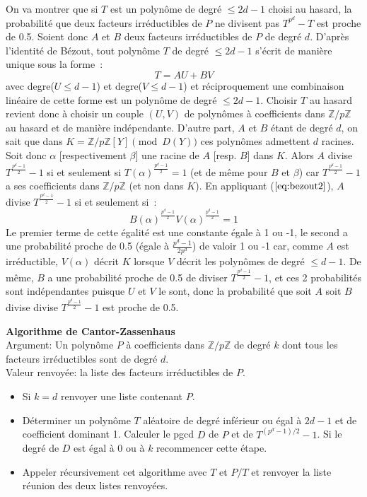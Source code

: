 \documentclass[a4paper,11pt]{book}
\begin{document}
\begin{giacjshere}
On va montrer que si $T$ est un polynôme de degré $\leq 2d-1$ choisi au hasard,
la probabilité que deux facteurs irréductibles de $P$ ne divisent pas 
$T^{p^d}-T$ est proche de 0.5. Soient donc $A$ et $B$ deux facteurs
irréductibles de $P$ de degré $d$. D'après l'identité de Bézout, tout 
polynôme $T$ de degré $\leq 2d-1$ s'écrit de manière unique sous la forme~:
\begin{equation} \label{eq:bezout2} 
T = A U + B V 
\end{equation}
avec degre($U \leq d-1$) et degre($V \leq d-1$) et réciproquement 
une combinaison linéaire de cette forme est un polynôme de degré $\leq 2d-1$.
Choisir $T$ au hasard revient donc à choisir un couple $(U,V)$ de polynômes
à coefficients dans $\mathbb{Z}/p\mathbb{Z}$ au hasard et
de manière indépendante. D'autre part, $A$ et $B$ étant de degré $d$, on
sait que dans $K=\mathbb{Z}/p\mathbb{Z}[Y] \pmod{D(Y)}$ ces polynômes admettent $d$ racines.
Soit donc $\alpha$ [respectivement $\beta$] une racine de $A$ [resp. $B$]
dans $K$. Alors $A$ divise $T^{\frac{p^d-1}{2}}-1$
si et seulement si $T(\alpha )^{\frac{p^d-1}{2}}=1$ (et de même pour
$B$ et $\beta$) car $T^{\frac{p^d-1}{2}}-1$ a ses coefficients dans
$\mathbb{Z}/p\mathbb{Z}$ (et non dans $K$). 
En appliquant (\(\ref{eq:bezout2}\)), $A$ divise $T^{\frac{p^d-1}{2}}-1$
si et seulement si~:
\[ B(\alpha )^{\frac{p^d-1}{2}}V(\alpha )^{\frac{p^d-1}{2}}=1 \]
Le premier terme de cette égalité est une constante égale à 1 ou -1, 
le second a une probabilité proche de 0.5 (égale à $\frac{p^d-1}{2p^d}$)
de valoir 1 ou -1 car, comme $A$ est irréductible,
$V(\alpha)$ décrit $K$ lorsque $V$ décrit les 
polynômes de degré $\leq d-1$.
De même, $B$ a une probabilité proche de 0.5 de diviser 
$T^{\frac{p^d-1}{2}}-1$, et ces 2 probabilités sont indépendantes
puisque $U$ et $V$ le sont, donc la probabilité que soit $A$ soit $B$ divise
divise $T^{\frac{p^d-1}{2}}-1$ est proche de 0.5.

{\bf Algorithme de Cantor-Zassenhaus}\\
Argument: Un polynôme $P$ à coefficients dans $\mathbb{Z}/p\mathbb{Z}$ de degré $k$
dont tous les facteurs irréductibles sont de degré $d$.\\
Valeur renvoyée: la liste des facteurs irréductibles de $P$.\\
\begin{itemize}
\item Si $k=d$ renvoyer une liste contenant $P$.
\item Déterminer un polynôme $T$ aléatoire de degré inférieur ou égal
à $2d-1$ et de coefficient dominant 1. Calculer le pgcd $D$ de $P$
et de $T^{(p^d-1)/2}-1$. Si le degré de $D$ est égal à 0 ou à $k$ 
recommencer cette étape.
\item Appeler récursivement cet algorithme avec $T$ et $P/T$ et
renvoyer la liste réunion des deux listes renvoyées.
\end{itemize}


\end{giacjshere}
\end{document}
